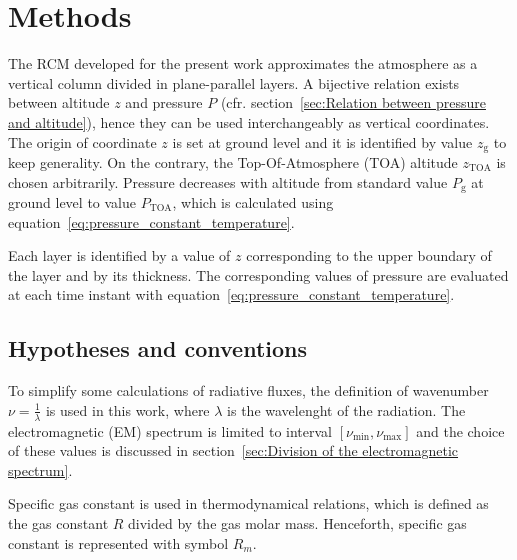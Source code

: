 \documentclass[a4paper,10pt,twocolumn,\classoptions]{article}
\newcommand{\zTOA}{z_\text{TOA}}
\newcommand{\PTOA}{P_\text{TOA}}
\begin{document}
\section{Methods}
\label{sec:Methods}
The RCM developed for the present work approximates the atmosphere as a vertical column divided in %
plane-parallel layers. 
A bijective relation exists between altitude $z$ and pressure $P$ (cfr. section~\ref{sec:Relation between pressure and altitude}), hence they can be used interchangeably as vertical coordinates. The origin of coordinate $z$ is set at ground level and it is identified by value $z_\text{g}$ to keep generality. On the contrary, the Top-Of-Atmosphere (TOA) altitude $\zTOA$ is chosen arbitrarily. Pressure decreases with altitude from standard value $P_\text{g}$ at ground level to value $\PTOA$, which is calculated using equation~\eqref{eq:pressure_constant_temperature}. %

Each layer is identified by a value of $z$ corresponding to the upper boundary of the layer and by its thickness. The corresponding values of pressure are evaluated at each time instant with equation~\eqref{eq:pressure_constant_temperature}.



\subsection{Hypotheses and conventions}
\label{sec:Hypotheses and conventions}
To simplify some calculations of radiative fluxes,
the definition of wavenumber $\nu = \frac{1}{\lambda}$ is used in this work, where $\lambda$ is the wavelenght of the radiation. The electromagnetic (EM) spectrum is limited to interval $[\nu_\text{min}, \nu_\text{max}]$ and the choice of these values is discussed in section~\ref{sec:Division of the electromagnetic spectrum}.

Specific gas constant is used in thermodynamical relations, which is defined as the gas constant $R$ divided by the gas molar mass. Henceforth, specific gas constant is represented with symbol $R_m$.
\end{document}
